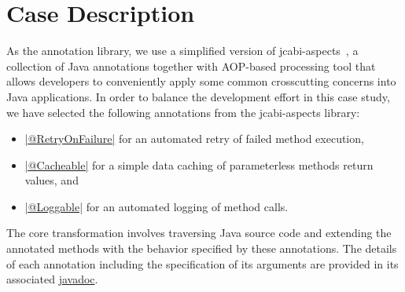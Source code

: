 
\section{Case Description}
\label{sec:Description}

As the annotation library, we use a simplified version of jcabi-aspects~\cite{jcabi}, a collection of Java annotations together with AOP-based processing tool that allows developers to conveniently apply some common crosscutting concerns into Java applications.
In order to balance the development effort in this case study, we have selected the following annotations from the jcabi-aspects library:
%
\begin{itemize}[--]
  \item \href{https://github.com/fikovnik/ttc15-live-contest/blob/master/src/ttc15-tranj/src/main/java/ttc15/tranj/annotation/RetryOnFailure.java}{\javainline|@RetryOnFailure|} for an automated retry of failed method execution,
  \item \href{https://github.com/fikovnik/ttc15-live-contest/blob/master/src/ttc15-tranj/src/main/java/ttc15/tranj/annotation/Cacheable.java}{\javainline|@Cacheable|} for a simple data caching of parameterless methods return values, and
  \item \href{https://github.com/fikovnik/ttc15-live-contest/blob/master/src/ttc15-tranj/src/main/java/ttc15/tranj/annotation/Loggable.java}{\javainline|@Loggable|} for an automated logging of method calls.
\end{itemize}

The core transformation involves traversing Java source code and extending the annotated methods with the behavior specified by these annotations.
The details of each annotation including the specification of its arguments are provided in its associated \href{https://github.com/fikovnik/ttc15-live-contest/tree/master/src/ttc15-tranj/src/main/java/ttc15/tranj/annotation}{javadoc}.

